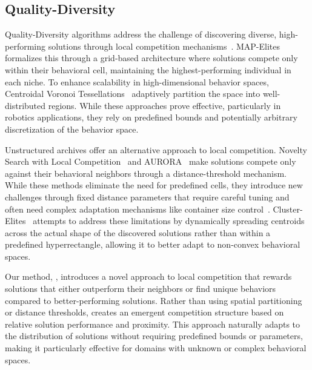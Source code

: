 \subsection{Quality-Diversity}
%
Quality-Diversity algorithms address the challenge of discovering diverse, high-performing solutions through local competition mechanisms~\citep{pugh_QualityDiversityNew_2016}. MAP-Elites~\citep{mouret_IlluminatingSearchSpaces_2015} formalizes this through a grid-based architecture where solutions compete only within their behavioral cell, maintaining the highest-performing individual in each niche. To enhance scalability in high-dimensional behavior spaces, Centroidal Voronoi Tessellations~\citep{vassiliades_UsingCentroidalVoronoi_2018} adaptively partition the space into well-distributed regions. While these approaches prove effective, particularly in robotics applications, they rely on predefined bounds and potentially arbitrary discretization of the behavior space.

Unstructured archives offer an alternative approach to local competition. Novelty Search with Local Competition~\citep{lehman_EvolvingDiversityVirtual_2011} and AURORA~\citep{cully_AutonomousSkillDiscovery_2019,qd_framework} make solutions compete only against their behavioral neighbors through a distance-threshold mechanism. While these methods eliminate the need for predefined cells, they introduce new challenges through fixed distance parameters that require careful tuning and often need complex adaptation mechanisms like container size control~\citep{csc}. Cluster-Elites~\citep{vassiliades_ComparisonIlluminationAlgorithms_2017} attempts to address these limitations by dynamically spreading centroids across the actual shape of the discovered solutions rather than within a predefined hyperrectangle, allowing it to better adapt to non-convex behavioral spaces.

Our method, \ours{}, introduces a novel approach to local competition that rewards solutions that either outperform their neighbors or find unique behaviors compared to better-performing solutions. Rather than using spatial partitioning or distance thresholds, \ours{} creates an emergent competition structure based on relative solution performance and proximity. This approach naturally adapts to the distribution of solutions without requiring predefined bounds or parameters, making it particularly effective for domains with unknown or complex behavioral spaces.
